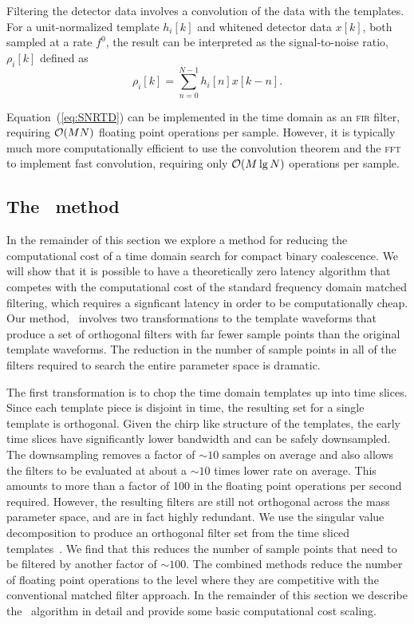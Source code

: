 Filtering the detector data involves a convolution of the data with the
templates.  For a unit-normalized template $h_i[k]$ and whitened detector data $x[k]$, both sampled at a rate $f^0$, the result can be interpreted as the signal-to-noise ratio, $\rho_i[k]$ defined as
%
%
\begin{equation}
	\label{eq:SNRTD}
	\rho_i [k] = \sum_{n=0}^{N-1} h_{i}[n] x [k-n].
\end{equation}

Equation~(\ref{eq:SNRTD}) can be implemented in the time domain as an \textsc{fir} filter, requiring $\mathcal O(M N)$ floating point operations per sample.  However, it is typically much more computationally efficient to use the convolution theorem and the \textsc{fft} to implement fast convolution, requiring only $\mathcal O(M \lg N)$ operations per sample.


\subsection{The \lloid\ method}

In the remainder of this section we explore a method for reducing the
computational cost of a time domain search for compact binary coalescence.  We
will show that it is possible to have a theoretically zero latency algorithm
that competes with the computational cost of the standard frequency domain
matched filtering, which requires a signficant latency in order to be
computationally cheap. Our method, \lloid\ involves two transformations to the
template waveforms that produce a set of orthogonal filters with far fewer
sample points than the original template waveforms.  The reduction in the
number of sample points in all of the filters required to search the entire
parameter space is dramatic.  

The first transformation is to chop the time domain templates up into time
slices.  Since each template piece is disjoint in time, the resulting set for a
single template is orthogonal.  Given the chirp like structure of the
templates, the early time slices have significantly lower bandwidth and can be
safely downsampled.  The downsampling removes a factor of $\sim 10$ samples on
average and also allows the filters to be evaluated at about a $\sim 10$ times
lower rate on average.  This amounts to more than a factor of 100 in the
floating point operations per second required.  However, the resulting filters
are still not orthogonal across the mass parameter space, and are in fact
highly redundant.  We use the singular value decomposition to produce an
orthogonal filter set from the time sliced templates~\cite{Cannon:2010p10398}.
We find that this reduces the number of sample points that need to be filtered
by another factor of $\sim 100$.  The combined methods reduce the number of
floating point operations to the level where they are competitive with the
conventional matched filter approach.  In the remainder of this section we
describe the \lloid\ algorithm in detail and provide some basic computational
cost scaling.  

